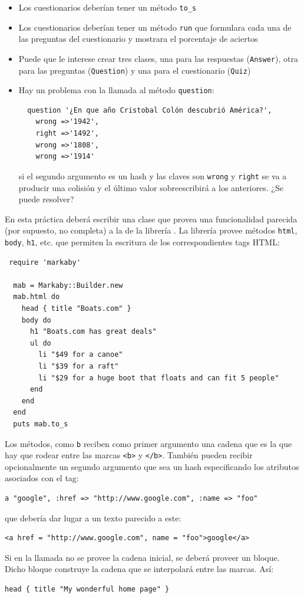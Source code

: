 \begin{itemize}
\item Los cuestionarios deberían tener un método \verb|to_s|
\item Los cuestionarios deberían tener un método \verb|run| que formulara
cada una de las preguntas del cuestionario y mostrara el porcentaje de aciertos
\item Puede que le interese crear tres clases, una para las respuestas (\verb|Answer|),
otra para las preguntas (\verb|Question|) y una para el cuestionario (\verb|Quiz|)
\item  Hay un problema con la llamada al método \verb|question|:
\begin{verbatim}
  question '¿En que año Cristobal Colón descubrió América?',
    wrong =>'1942',
    right =>'1492',
    wrong =>'1808',
    wrong =>'1914'
\end{verbatim}
si el segundo argumento es un hash y las claves son \verb|wrong| y \verb|right| se va a 
producir una colisión y el último valor sobreescribirá a los anteriores. ¿Se puede resolver?
\end{itemize}


\label{sectionpractica:htmldsl}
En esta práctica deberá escribir una clase que provea una funcionalidad 
parecida (por supuesto, no completa)
 a la de la librería
.
La librería provee métodos \verb|html|, \verb|body|, \verb|h1|, etc. que permiten 
la escritura de los correspondientes tags HTML:
\begin{verbatim}
 require 'markaby'

  mab = Markaby::Builder.new
  mab.html do
    head { title "Boats.com" }
    body do
      h1 "Boats.com has great deals"
      ul do
        li "$49 for a canoe"
        li "$39 for a raft"
        li "$29 for a huge boot that floats and can fit 5 people"
      end
    end
  end
  puts mab.to_s
\end{verbatim}
Los métodos, como \verb|b| reciben como primer argumento una cadena que es la que hay que rodear entre
las marcas \verb|<b>| y \verb|</b>|.
También pueden recibir opcionalmente un segundo argumento que sea un hash
especificando los atributos asociados con el tag:
\begin{verbatim}
a "google", :href => "http://www.google.com", :name => "foo"
\end{verbatim}
que debería dar lugar a un texto parecido a este:
\begin{verbatim}
<a href = "http://www.google.com", name = "foo">google</a>
\end{verbatim}
Si en la llamada no se provee la cadena inicial, se deberá proveer un bloque.
Dicho bloque construye la cadena que se interpolará entre las marcas.
Así:
\begin{verbatim}
head { title "My wonderful home page" }
\end{verbatim}

